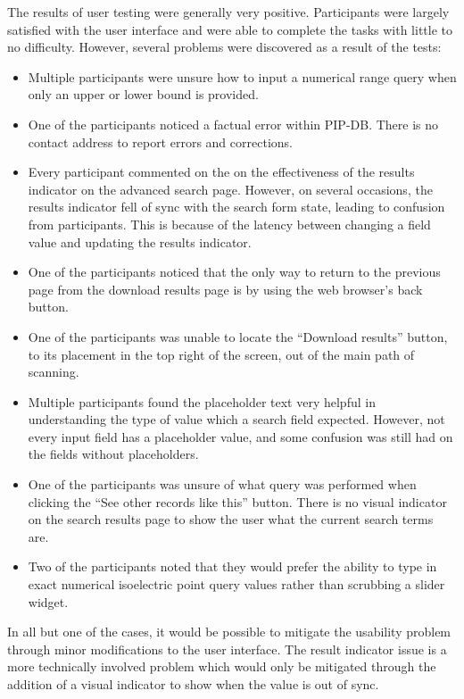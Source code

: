 The results of user testing were generally very positive. Participants
were largely satisfied with the user interface and were able to
complete the tasks with little to no difficulty. However, several
problems were discovered as a result of the tests:

\begin{itemize}
\item Multiple participants were unsure how to input a numerical range
  query when only an upper or lower bound is provided.
\item One of the participants noticed a factual error within
  PIP-DB. There is no contact address to report errors and
  corrections.
\item Every participant commented on the on the effectiveness of the
  results indicator on the advanced search page. However, on several
  occasions, the results indicator fell of sync with the search form
  state, leading to confusion from participants. This is because of
  the latency between changing a field value and updating the results
  indicator.
\item One of the participants noticed that the only way to return to
  the previous page from the download results page is by using the web
  browser's back button.
\item One of the participants was unable to locate the ``Download
  results'' button, to its placement in the top right of the screen,
  out of the main path of scanning.
\item Multiple participants found the placeholder text very helpful in
  understanding the type of value which a search field
  expected. However, not every input field has a placeholder value,
  and some confusion was still had on the fields without placeholders.
\item One of the participants was unsure of what query was performed
  when clicking the ``See other records like this'' button. There is
  no visual indicator on the search results page to show the user what
  the current search terms are.
\item Two of the participants noted that they would prefer the ability
  to type in exact numerical isoelectric point query values rather
  than scrubbing a slider widget.
\end{itemize}

In all but one of the cases, it would be possible to mitigate the
usability problem through minor modifications to the user
interface. The result indicator issue is a more technically involved
problem which would only be mitigated through the addition of a visual
indicator to show when the value is out of sync.

